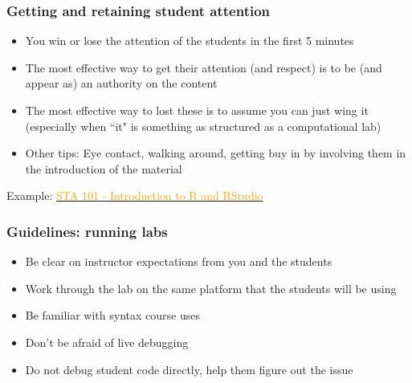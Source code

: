 \documentclass{beamer}
\begin{document}
\begin{frame}
\frametitle{Getting and retaining student attention}

\begin{itemize}[<+->]

\item You win or lose the attention of the students in the first 5 minutes

\item The most effective way to get their attention (and respect) is to be (and appear as) an authority on the content

\item The most effective way to lost these is to assume you can just wing it (especially when ``it" is something as structured as a computational lab)

\item Other tips: Eye contact, walking around, getting buy in by involving them in the introduction of the material

\end{itemize}

Example: \href{https://www2.stat.duke.edu/courses/Spring16/sta101.001/post/labs/intro_to_r.html}{\textcolor{orange}{STA 101 - Introduction to R and RStudio}}

\end{frame}


\begin{frame}
\frametitle{Guidelines: running labs}

\begin{itemize}[<+->]

\item Be clear on instructor expectations from you and the students

\item Work through the lab on the same platform that the students will be using

\item Be familiar with syntax course uses

\item Don't be afraid of live debugging

\item Do not debug student code directly, help them figure out the issue

\end{itemize}


\end{frame}
\end{document}
